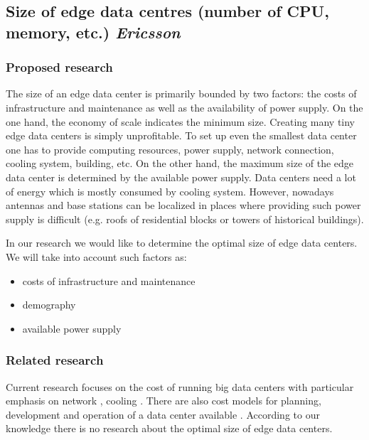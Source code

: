 \subsection{Size of edge data centres (number of CPU, memory, etc.) \emph{Ericsson}}
\subsubsection{Proposed research}

The size of an edge data center is primarily bounded by two factors: the costs of infrastructure and maintenance as well as the availability of power supply.
On the one hand, the economy of scale indicates the minimum size.
Creating many tiny edge data centers is simply unprofitable.
To set up even the smallest data center one has to provide computing resources, power supply, network connection, cooling system, building, etc.
On the other hand, the maximum size of the edge data center is determined by the available power supply.
Data centers need a lot of energy which is mostly consumed by cooling system.
However, nowadays antennas and base stations can be localized in places where providing such power supply is difficult (e.g. roofs of residential blocks or towers of historical buildings).

In our research we would like to determine the optimal size of edge data centers.
We will take into account such factors as:
\begin{itemize}
\item costs of infrastructure and maintenance
\item demography
\item available power supply
\end{itemize}

\subsubsection{Related research}
Current research focuses on the cost of running big data centers with particular emphasis on network \cite{Greenberg:2008:CCR:1496091.1496103}, cooling \cite{Pakbaznia:2009:MDC:1594233.1594268}.
There are also cost models for planning, development and operation of a data center available \cite{patel2005cost}.
According to our knowledge there is no research about the optimal size of edge data centers.